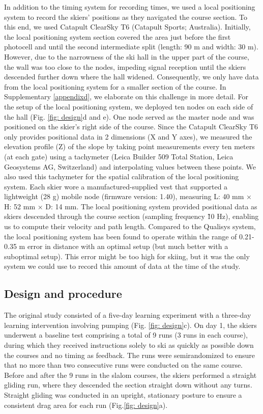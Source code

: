 \documentclass{article}
\begin{document}
In addition to the timing system for recording times, we used a local positioning system to record the skiers' positions as they navigated the course section. To this end, we used Catapult ClearSky T6 (Catapult Sports; Australia). Initially, the local positioning system section covered the area just before the first photocell and until the second intermediate split (length: 90 m and width: 30 m). However, due to the narrowness of the ski hall in the upper part of the course, the wall was too close to the nodes, impeding signal reception until the skiers descended further down where the hall widened.  Consequently, we only have data from the local positioning system for a smaller section of the course. In Supplementary \ref{appendixd}, we elaborate on this challenge in more detail. For the setup of the local positioning system, we deployed ten nodes on each side of the hall (Fig. \ref{fig: design}d and e). One node served as the master node and was positioned on the skier's right side of the course. Since the Catapult ClearSky T6 only provides positional data in 2 dimensions (X and Y axes), we measured the elevation profile (Z) of the slope by taking point measurements every ten meters (at each gate) using a tachymeter (Leica Builder 509 Total Station, Leica Geosystems AG, Switzerland) and interpolating values between these points. We also used this tachymeter for the spatial calibration of the local positioning system. Each skier wore a manufactured-supplied vest that supported a lightweight (28 g) mobile node (firmware version: 1.40), measuring L: 40 mm × H: 52 mm × D: 14 mm.  The local positioning system provided positional data as skiers descended through the course section (sampling frequency \~10 Hz), enabling us to compute their velocity and path length. Compared to the Qualisys system, the local positioning system has been found to operate within the range of 0.21-0.35 m error in distance with an optimal setup (but much better with a suboptimal setup)\cite{luteberget_validity_2018}. This error might be too high for skiing, but it was the only system we could use to record this amount of data at the time of the study.

\subsection{Design and procedure}
The original study consisted of a five-day learning experiment with a three-day learning intervention involving pumping (Fig. \ref{fig: design}c). On day 1, the skiers underwent a baseline test comprising a total of 9 runs (3 runs in each course), during which they received instructions solely to ski as quickly as possible down the courses and no timing as feedback. The runs were semirandomized to ensure that no more than two consecutive runs were conducted on the same course. Before and after the 9 runs in the slalom courses, the skiers performed a straight gliding run, where they descended the section straight down without any turns. Straight gliding was conducted in an upright, stationary posture to ensure a consistent drag area for each run (Fig.\ref{fig: design}a).
\end{document}
